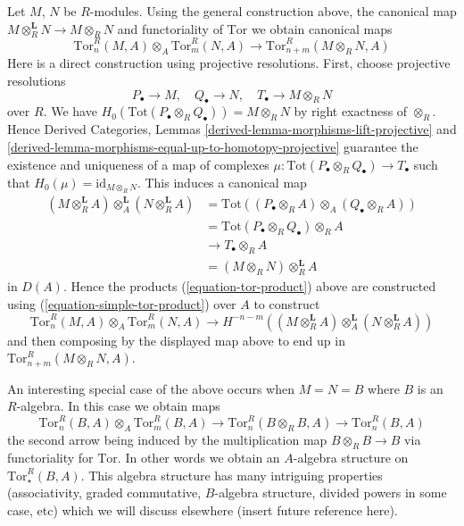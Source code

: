 \medskip\noindent
Let $M$, $N$ be $R$-modules. Using the general construction above,
the canonical map $M \otimes_R^\mathbf{L} N \to M \otimes_R N$ and
functoriality of $\text{Tor}$ we obtain canonical maps
\begin{equation}
\label{equation-tor-product}
\text{Tor}^R_n(M, A) \otimes_A \text{Tor}^R_m(N, A)
\longrightarrow \text{Tor}_{n + m}^R(M \otimes_R N, A)
\end{equation}
Here is a direct construction using projective resolutions. First, choose
projective resolutions
$$
P_\bullet \to M, \quad Q_\bullet \to N, \quad T_\bullet \to M \otimes_R N
$$
over $R$. We have
$H_0(\text{Tot}(P_\bullet \otimes_R Q_\bullet)) = M \otimes_R N$ by
right exactness of $\otimes_R$. Hence
Derived Categories, Lemmas \ref{derived-lemma-morphisms-lift-projective} and
\ref{derived-lemma-morphisms-equal-up-to-homotopy-projective}
guarantee the existence and uniqueness of a map of complexes
$\mu : \text{Tot}(P_\bullet \otimes_R Q_\bullet) \to T_\bullet$ such that
$H_0(\mu) = \text{id}_{M \otimes_R N}$. This induces a canonical map
\begin{align*}
(M \otimes_R^{\mathbf{L}} A) \otimes_A^{\mathbf{L}}
(N \otimes_R^{\mathbf{L}} A)
& =
\text{Tot}((P_\bullet \otimes_R A) \otimes_A (Q_\bullet \otimes_R A)) \\
& =
\text{Tot}(P_\bullet \otimes_R Q_\bullet) \otimes_R A \\
& \to
T_\bullet \otimes_R A \\
& = (M \otimes_R N) \otimes_R^{\mathbf{L}} A
\end{align*}
in $D(A)$. Hence the products (\ref{equation-tor-product}) above are
constructed using (\ref{equation-simple-tor-product}) over $A$ to construct
$$
\text{Tor}^R_n(M, A) \otimes_A \text{Tor}^R_m(N, A) \to
H^{-n-m}((M \otimes_R^{\mathbf{L}} A) \otimes_A^{\mathbf{L}}
(N \otimes_R^{\mathbf{L}} A))
$$
and then composing by the displayed map above to end up in
$\text{Tor}_{n + m}^R(M \otimes_R N, A)$.

\medskip\noindent
An interesting special case of the above occurs when $M = N = B$
where $B$ is an $R$-algebra. In this case we obtain maps
$$
\text{Tor}_n^R(B, A) \otimes_A \text{Tor}_m^R(B, A)
\longrightarrow
\text{Tor}_n^R(B \otimes_R B, A)
\longrightarrow
\text{Tor}_n^R(B, A)
$$
the second arrow being induced by the multiplication map
$B \otimes_R B \to B$ via functoriality for $\text{Tor}$.
In other words we obtain an $A$-algebra structure on
$\text{Tor}^R_{\star}(B, A)$. This algebra structure has many intriguing
properties (associativity, graded commutative, $B$-algebra structure,
divided powers in some case, etc) which we will discuss elsewhere (insert
future reference here).

